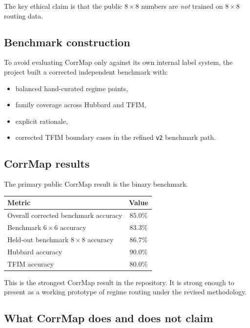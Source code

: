 \documentclass[11pt]{article}
\begin{document}
The key ethical claim is that the public \(8\times 8\) numbers are \emph{not} trained on \(8\times 8\) routing data.

\subsection{Benchmark construction}

To avoid evaluating CorrMap only against its own internal label system, the project built a corrected independent benchmark with:

\begin{itemize}
\item balanced hand-curated regime points,
\item family coverage across Hubbard and TFIM,
\item explicit rationale,
\item corrected TFIM boundary cases in the refined \verb|v2| benchmark path.
\end{itemize}

\subsection{CorrMap results}

The primary public CorrMap result is the binary benchmark.

\begin{center}
\begin{tabular}{lc}
\toprule
Metric & Value \\
\midrule
Overall corrected benchmark accuracy & \(85.0\%\) \\
Benchmark \(6\times 6\) accuracy & \(83.3\%\) \\
Held-out benchmark \(8\times 8\) accuracy & \(86.7\%\) \\
Hubbard accuracy & \(90.0\%\) \\
TFIM accuracy & \(80.0\%\) \\
\bottomrule
\end{tabular}
\end{center}

This is the strongest CorrMap result in the repository. It is strong enough to present as a working prototype of regime routing under the revised methodology.

\subsection{What CorrMap does and does not claim}
\end{document}
